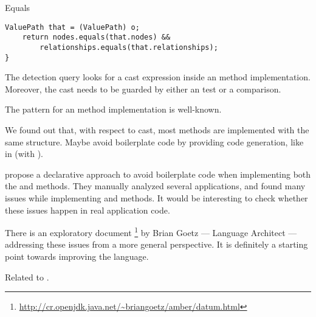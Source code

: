 \begin{pattern}{Equals}
\begin{lstlisting}[style=java,label=lst:equals,caption=\pname{} pattern guarded by a \code{getClass} comparison]
    ValuePath that = (ValuePath) o;
    return nodes.equals(that.nodes) &&
        relationships.equals(that.relationships);
}
\end{lstlisting}

\detection

The detection query looks for a cast expression inside an
 method implementation.
Moreover, the cast needs to be guarded by either an
 test or a  comparison.

\discussion{}
The pattern for an  method implementation is well-known.


We found out that, with respect to cast,
most  methods are implemented with the same structure.
Maybe avoid boilerplate code by providing code generation,
like in \haskell{} (with ).

\cite{vaziriDeclarativeObjectIdentity2007} propose a declarative approach
to avoid boilerplate code when implementing both
the  and  methods.
They manually analyzed several applications,
and found many issues while implementing  and
 methods.
It would be interesting to check whether these issues happen in real
application code.

There is an exploratory document%
\footnote{\url{http://cr.openjdk.java.net/\~briangoetz/amber/datum.html}}
by Brian Goetz --- \java{} Language Architect ---
addressing these issues from a more general perspective.
It is definitely a starting point towards improving the \java{} language.


\related{}
Related to .
\end{pattern}